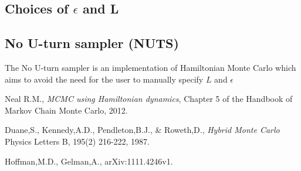 \documentclass[11pt]{article}
\begin{document}
\subsection{Choices of $\epsilon$ and L}


\subsection{No U-turn sampler (NUTS)}
The No U-turn sampler\cite{NUTS} is an implementation of Hamiltonian Monte Carlo which aims to avoid the need for the user to manually specify $L$ and $\epsilon$
\begin{thebibliography}{9}

  Neal R.M.,
  \emph{MCMC using Hamiltonian dynamics},
  Chapter 5 of the Handbook of Markov Chain Monte Carlo,
  2012.
  
  Duane,S., Kennedy,A.D., Pendleton,B.J., \& Roweth,D.,
  \emph{Hybrid Monte Carlo }
  Physics Letters B, 195(2) 216-222, 1987.

  Hoffman,M.D., Gelman,A.,
  arXiv:1111.4246v1.

\end{thebibliography}
\end{document}
